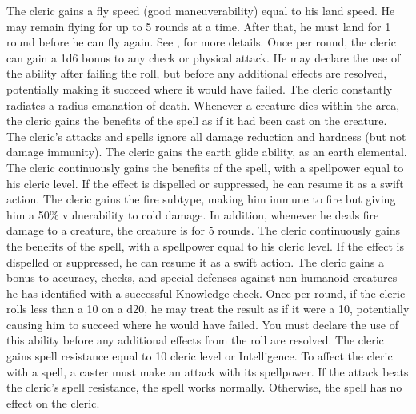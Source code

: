     The cleric gains a fly speed (good maneuverability) equal to his land speed.
    He may remain flying for up to 5 rounds at a time.
    After that, he must land for 1 round before he can fly again.
    See , for more details.
    Once per round, the cleric can gain a \plus1d6 bonus to any check or physical attack.
    He may declare the use of the ability after failing the roll, but before any additional effects are resolved, potentially making it succeed where it would have failed.
    The cleric constantly radiates a \areamed radius emanation of death.
    Whenever a creature dies within the area, the cleric gains the benefits of the  spell as if it had been cast on the creature.
    The cleric's attacks and spells ignore all damage reduction and hardness (but not damage immunity).
    The cleric gains the earth glide ability, as an earth elemental.
     The cleric continuously gains the benefits of the 
    spell, with a spellpower equal to his cleric level.
    If the effect is dispelled or suppressed, he can resume it as a swift action.
    The cleric gains the fire subtype, making him immune to fire but giving him a 50\% vulnerability to cold damage.
    In addition, whenever he deals fire damage to a creature, the creature is \ignited for 5 rounds.
     The cleric continuously gains the benefits of the 
    spell, with a spellpower equal to his cleric level.
    If the effect is dispelled or suppressed, he can resume it as a swift action.
    The cleric gains a  bonus to accuracy, checks, and special defenses against non-humanoid creatures he has identified with a successful Knowledge check.
    Once per round, if the cleric rolls less than a 10 on a d20, he may treat the result as if it were a 10, potentially causing him to succeed where he would have failed.
    You must declare the use of this ability before any additional effects from the roll are resolved.
    The cleric gains spell resistance equal to 10 \add cleric level or Intelligence.
    To affect the cleric with a spell, a caster must make an attack with its spellpower.
    If the attack beats the cleric's spell resistance, the spell works normally.
    Otherwise, the spell has no effect on the cleric.

